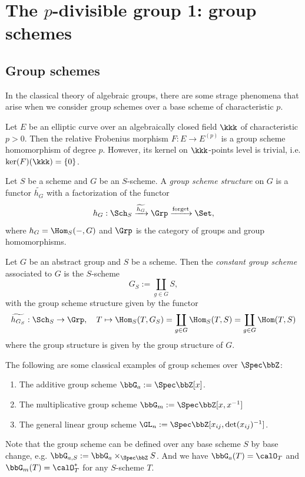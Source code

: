 \section[The p-divisible group 1: group schemes]{The $p$-divisible group 1: group schemes}

\subsection{Group schemes}

In the classical theory of algebraic groups, there are some strage phenomena that arise when we consider group schemes over a base scheme of characteristic $p$.

\begin{example}
	Let $E$ be an elliptic curve over an algebraically closed field $\kkk$ of characteristic $p>0$.
	Then the relative Frobenius morphism $F: E \to E^{(p)}$ is a group scheme homomorphism of degree $p$.
	However, its kernel on $\kkk$-points level is trivial, i.e. $\ker(F)(\kkk) = \{0\}$.
\end{example}

\begin{definition}
	Let $S$ be a scheme and $G$ be an $S$-scheme.
	A \emph{group scheme structure} on $G$ is a functor $\widetilde{h_G}$ with a factorization of the functor
	\[ h_G: \Sch_S \xrightarrow{\widetilde{h_G}} \Grp \xrightarrow{\text{forget}} \Set, \]
	where $h_G = \Hom_S(-,G)$ and $\Grp$ is the category of groups and group homomorphisms.
\end{definition}

\begin{example}
	Let $G$ be an abstract group and $S$ be a scheme.
	Then the \emph{constant group scheme} associated to $G$ is the $S$-scheme
	\[ G_S := \coprod_{g \in G} S, \]
	with the group scheme structure given by the functor
	\[ \widetilde{h_{G_S}}: \Sch_S \to \Grp, \quad T \mapsto \Hom_S(T, G_S) = \coprod_{g \in G} \Hom_S(T, S) = \coprod_{g \in G} \Hom(T, S) \]
	where the group structure is given by the group structure of $G$.
\end{example}

\begin{example}
	The following are some classical examples of group schemes over $\Spec \bbZ$:
	\begin{enumerate}
		\item The additive group scheme $\bbG_a := \Spec \bbZ[x]$.
		\item The multiplicative group scheme $\bbG_m := \Spec \bbZ[x, x^{-1}]$
		\item The general linear group scheme $\GL_n := \Spec \bbZ[x_{ij}, \det(x_{ij})^{-1}]$.
	\end{enumerate}
	Note that the group scheme can be defined over any base scheme $S$ by base change, e.g. $\bbG_{a,S} := \bbG_a \times_{\Spec \bbZ} S$.
	And we have $\bbG_{a}(T) = \calO_T$ and $\bbG_{m}(T) = \calO_T^*$ for any $S$-scheme $T$.
\end{example}

